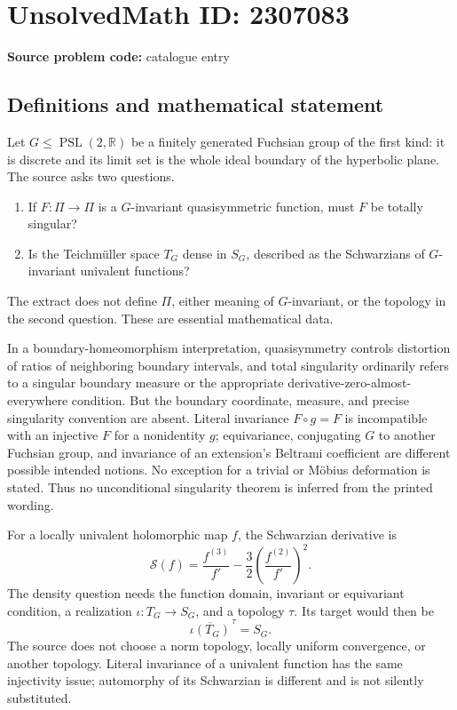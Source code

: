 \documentclass[11pt]{article}
\newcommand{\R}{\mathbb{R}}
\begin{document}
\section*{UnsolvedMath ID: 2307083}
\textbf{Source problem code:} catalogue entry
\subsection{Definitions and mathematical statement}
Let $G\le\operatorname{PSL}(2,\R)$ be a finitely generated Fuchsian group of the first kind: it is discrete and its limit set is the whole ideal boundary of the hyperbolic plane. The source asks two questions.
\begin{enumerate}
\item If $F:\Pi\to\Pi$ is a $G$-invariant quasisymmetric function, must $F$ be totally singular?
\item Is the Teichm\"uller space $T_G$ dense in $S_G$, described as the Schwarzians of $G$-invariant univalent functions?
\end{enumerate}
The extract does not define $\Pi$, either meaning of $G$-invariant, or the topology in the second question. These are essential mathematical data.

In a boundary-homeomorphism interpretation, quasisymmetry controls distortion of ratios of neighboring boundary intervals, and total singularity ordinarily refers to a singular boundary measure or the appropriate derivative-zero-almost-everywhere condition. But the boundary coordinate, measure, and precise singularity convention are absent. Literal invariance $F\circ g=F$ is incompatible with an injective $F$ for a nonidentity $g$; equivariance, conjugating $G$ to another Fuchsian group, and invariance of an extension's Beltrami coefficient are different possible intended notions. No exception for a trivial or M\"obius deformation is stated. Thus no unconditional singularity theorem is inferred from the printed wording.

For a locally univalent holomorphic map $f$, the Schwarzian derivative is
\[
\mathcal S(f)=\frac{f^{(3)}}{f'}-\frac32\left(\frac{f^{(2)}}{f'}\right)^2.
\]
The density question needs the function domain, invariant or equivariant condition, a realization $\iota:T_G\to S_G$, and a topology $\tau$. Its target would then be
\[
\overline{\iota(T_G)}^{\,\tau}=S_G.
\]
The source does not choose a norm topology, locally uniform convergence, or another topology. Literal invariance of a univalent function has the same injectivity issue; automorphy of its Schwarzian is different and is not silently substituted.
\end{document}
